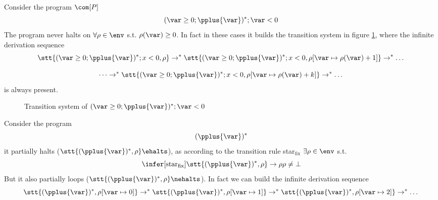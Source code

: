 \begin{example}\label{ex:neverhalts}
  Consider the program \(\com[P]\)
  \[(\var \geq 0; \pplus{\var})^*;\var < 0\] The program never halts on
  \(\forall \rho \in \env\) s.t. \(\rho(\var) \geq 0\). In fact in
  these cases it builds the transition system in figure
  \ref{fig:tsysnhalt}, where the infinite derivation sequence
  \[\stt{(\var \geq 0; \pplus{\var})^*; x < 0, \rho} \to^* \stt{(\var
      \geq 0; \pplus{\var})^*; x < 0, \rho[\var \mapsto \rho(\var) +
      1]} \to^* \dots\]
  
  \[\dots \to^* \stt{(\var \geq 0; \pplus{\var})^*; x < 0, \rho[\var
      \mapsto \rho(\var) + k]} \to^* \dots \] is always present.
  \begin{figure}
    \caption{Transition system of \((\var \geq 0; \pplus{\var})^*;\var
      < 0\)}\label{fig:tsysnhalt}
  \end{figure}
\end{example}

\begin{example}\label{ex:partial}
  Consider the program \[(\pplus{\var})^*\] it partially halts
  (\(\stt{(\pplus{\var})^*, \rho}\ehalts\)), as according to the
  transition rule star\(_{\text{fix}}\) \(\exists \rho \in \env\) s.t.
  \[\infer[\text{star}_{\text{fix}}]{\stt{(\pplus{\var})^*, \rho} \to
    \rho}{\rho \neq \bot}\] But it also partially loops
(\(\stt{(\pplus{\var})^*, \rho}\nehalts\)). In fact we can build the
infinite derivation
sequence\[\stt{(\pplus{\var})^*, \rho[\var\mapsto 0]} \to^*
  \stt{(\pplus{\var})^*, \rho[\var\mapsto 1]} \to^*
  \stt{(\pplus{\var})^*, \rho[\var\mapsto 2]} \to^* \dots\]
\end{example}

